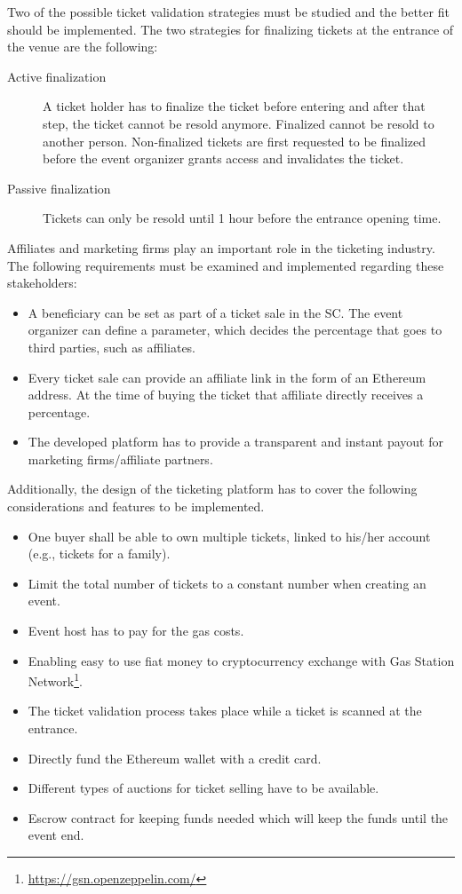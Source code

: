 Two of the possible ticket validation strategies must be studied and the better fit should be implemented. The two strategies for finalizing tickets at the entrance of the venue are the following:
\begin{description}
    \item[Active finalization] A ticket holder has to finalize the ticket before entering and after that step, the ticket cannot be resold anymore. Finalized cannot be resold to another person. Non-finalized tickets are first requested to be finalized before the event organizer grants access and invalidates the ticket.
    \item[Passive finalization] Tickets can only be resold until 1 hour before the entrance opening time.
\end{description}

Affiliates and marketing firms play an important role in the ticketing industry. The following requirements must be examined and implemented regarding these stakeholders:
\begin{itemize}
    \item A beneficiary can be set as part of a ticket sale in the SC. The event organizer can define a parameter, which decides the percentage that goes to third parties, such as affiliates.
    \item Every ticket sale can provide an affiliate link in the form of an Ethereum address. At the time of buying the ticket that affiliate directly receives a percentage.
    \item The developed platform has to provide a transparent and instant payout for marketing firms/affiliate partners.
\end{itemize}

Additionally, the design of the ticketing platform has to cover the following considerations and features to be implemented.
\begin{itemize}
    \item One buyer shall be able to own multiple tickets, linked to his/her account (e.g., tickets for a family).
    \item Limit the total number of tickets to a constant number when creating an event.
    \item Event host has to pay for the gas costs.
    \item Enabling easy to use fiat money to cryptocurrency exchange with Gas Station Network\footnote{\href{https://gsn.openzeppelin.com/}{https://gsn.openzeppelin.com/}}.
    \item The ticket validation process takes place while a ticket is scanned at the entrance.
    \item Directly fund the Ethereum wallet with a credit card.
    \item Different types of auctions for ticket selling have to be available.
    \item Escrow contract for keeping funds needed which will keep the funds until the event end.
\end{itemize}

